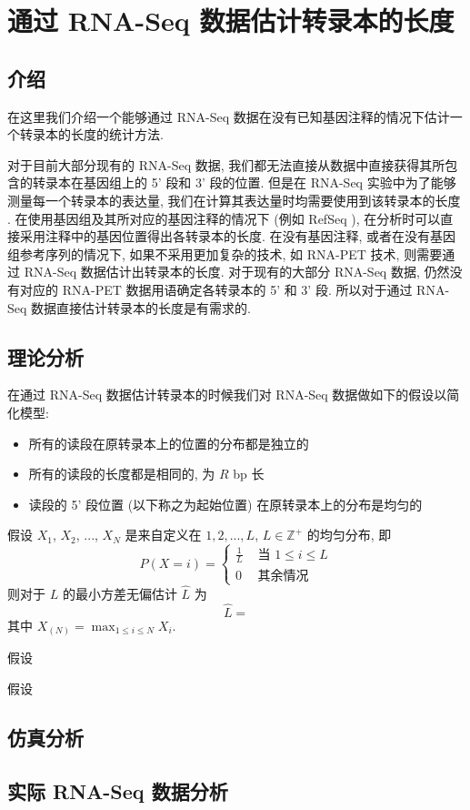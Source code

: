 \chapter{通过 RNA-Seq 数据估计转录本的长度}
\label{chap-lenest}

\section{介绍}
在这里我们介绍一个能够通过 RNA-Seq 数据在没有已知基因注释的情况下估计一个转录本的长度的统计方法. 

对于目前大部分现有的 RNA-Seq 数据, 
我们都无法直接从数据中直接获得其所包含的转录本在基因组上的 5' 段和 3' 段的位置. 
但是在 RNA-Seq 实验中为了能够测量每一个转录本的表达量, 
我们在计算其表达量时均需要使用到该转录本的长度 
\cite{mortazavi2008mapping, Jiang15042009, cufflinks.2010}. 
在使用基因组及其所对应的基因注释的情况下 (例如 RefSeq \cite{_refseq}), 
在分析时可以直接采用注释中的基因位置得出各转录本的长度. 
在没有基因注释, 或者在没有基因组参考序列的情况下, 
如果不采用更加复杂的技术, 如 RNA-PET \cite{Fullwood01042009} 技术, 
则需要通过 RNA-Seq 数据估计出转录本的长度. 对于现有的大部分 RNA-Seq 数据, 
仍然没有对应的 RNA-PET 数据用语确定各转录本的 5' 和 3' 段. 
所以对于通过 RNA-Seq 数据直接估计转录本的长度是有需求的. 

\section{理论分析}
在通过 RNA-Seq 数据估计转录本的时候我们对 RNA-Seq 数据做如下的假设以简化模型: 
\begin{itemize}
\item 所有的读段在原转录本上的位置的分布都是独立的

\item 所有的读段的长度都是相同的, 为 $R$ bp 长

\item 读段的 5' 段位置 (以下称之为起始位置) 在原转录本上的分布是均匀的
\end{itemize}

\begin{thm}
假设 $X_1$, $X_2$, ..., $X_N$ 是来自定义在 
${1, 2, ..., L}$, $L \in \mathbb{Z}^+$ 的均匀分布, 
即 
\[
P(X = i) =  \begin{cases}
\frac{1}{L} & \text{ 当 } 1 \leq i \leq L \\
0 & \text{ 其余情况 }
\end{cases}
\]
则对于 $L$ 的最小方差无偏估计 $\hat{L}$ 为
\begin{equation}
\hat{L} = 
\end{equation}
其中 $X_{(N)} = \max_{1 \leq i \leq N} X_i$. 
\end{thm}

\begin{thm}
假设
\end{thm}

\begin{thm}
假设
\end{thm}

\section{仿真分析}

\section{实际 RNA-Seq 数据分析}


